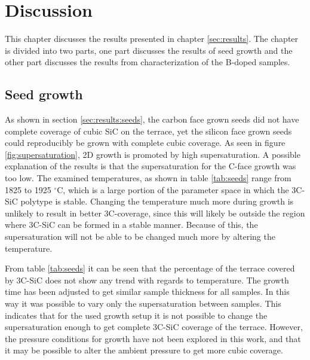 
\chapter{Discussion}
\label{sec:discussion}
This chapter discusses the results presented in chapter \ref{sec:results}. The chapter is divided into two parts, one part discusses the results of seed growth and the other part discusses the results from characterization of the B-doped samples. 

\section{Seed growth}
As shown in section \ref{sec:results:seeds}, the carbon face grown seeds did not have complete coverage of cubic SiC on the terrace, yet the silicon face grown seeds could reproducibly be grown with complete cubic coverage. As seen in figure \ref{fig:supersaturation}, 2D growth is promoted by high supersaturation. A possible explanation of the results is that the supersaturation for the C-face growth was too low. The examined temperatures, as shown in table \ref{tab:seeds}  range from 1825 to 1925 $^\circ$C, which is a large portion of the parameter space in which the 3C-SiC polytype is stable. Changing the temperature much more during growth is unlikely to result in better 3C-coverage, since this will likely be outside the region where 3C-SiC can be formed in a stable manner. Because of this, the supersaturation will not be able to be changed much more by altering the temperature. 

From table \ref{tab:seeds} it can be seen that the percentage of the terrace covered by 3C-SiC does not show any trend with regards to temperature. The growth time has been adjusted to get similar sample thickness for all samples. In this way it was possible to vary only the supersaturation between samples. This indicates that for the used growth setup it is not possible to change the supersaturation enough to get complete 3C-SiC coverage of the terrace. However, the pressure conditions for growth have not been explored in this work, and that it may be possible to alter the ambient pressure to get more cubic coverage. 

